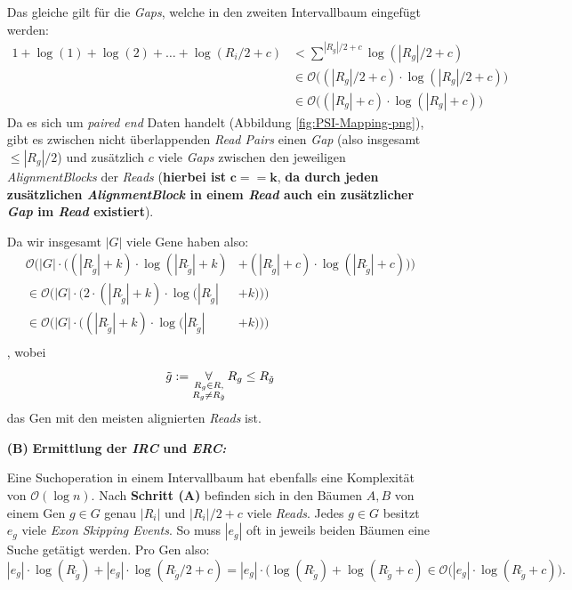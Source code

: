 \documentclass[12pt]{article}
\begin{document}
\begin{itemize}
        Das gleiche gilt für die \textit{Gaps}, welche in den zweiten Intervallbaum eingefügt werden:
        \begin{align*}
        1  + \log(1) + \log(2) + \dots + \log(R_{i}/2 + c) &< \sum^{|R_{g}|/2 + c} \log (|R_{g}|/2 + c) \\
                                                           &\in \mathcal{O}\Big((|R_{g}|/2 +c) \cdot \log(|R_{g}|/2 + c)\Big) \\
                                                           &\in \mathcal{O}\Big((|R_{g}| + c) \cdot \log(|R_{g}| + c)\Big)
        \end{align*}
        Da es sich um \textit{paired end} Daten handelt (Abbildung \ref{fig:PSI-Mapping-png}), gibt es zwischen nicht überlappenden \textit{Read Pairs} einen \textit{Gap}
        (also insgesamt $\le |R_{g}|/2$) und zusätzlich $c$ viele \textit{Gaps} zwischen den jeweiligen
        \textit{AlignmentBlocks} der \textit{Reads} (\textbf{hierbei ist} $\mathbf{c == k}$, \textbf{da durch jeden zusätzlichen \textit{AlignmentBlock} 
        in einem \textit{Read} auch ein zusätzlicher \textit{Gap} im \textit{Read} existiert}).

        Da wir insgesamt $|G|$ viele Gene haben also:
        \begin{align*}
            \mathcal{O}\Bigg(|G| \cdot \Big((|R_{\tilde g}| + k) \cdot \log(|R_{\tilde g}| + k) &+ (|R_{\tilde g}|+c) \cdot \log(|R_{\tilde g}| + c)\Big)\Bigg)\\
            \in \mathcal{O}\Bigg(|G| \cdot \Big(2 \cdot (|R_{\tilde g}| + k) \cdot \log(|R_{\tilde g}| &+ k)\Big)\Bigg)\\
            \in \mathcal{O}\Bigg(|G| \cdot \Big((|R_{\tilde g}| + k) \cdot \log(|R_{\tilde g}| &+ k)\Big)\Bigg)\\
        \end{align*}
        , wobei 
        \[
            \tilde g := \operatornamewithlimits\forall_{\substack{R_{g} \in R,\\R_{g} \not =  R_{\tilde g}}} R_{g} \le R_{\tilde g}
        \]
        das Gen mit den meisten alignierten \textit{Reads} ist.

    \item[\textbf{(B)}] \textbf{Ermittlung der \textit{IRC} und \textit{ERC:}}

        Eine Suchoperation in einem Intervallbaum hat ebenfalls eine Komplexität von $\mathcal{O}(\log n)$.
        Nach \textbf{Schritt (A)} befinden sich in den Bäumen $A,B$ von einem Gen $g \in G$ genau $|R_{i}|$
        und $|R_{i}|/2 + c$ viele \textit{Reads}.
        Jedes $g \in G$ besitzt $e_{g}$ viele \textit{Exon Skipping Events}. So muss 
        $|e_{g}|$ oft in jeweils beiden Bäumen eine Suche getätigt werden.
        Pro Gen also:
        \[
            |e_{g}| \cdot \log(R_{\tilde g}) + |e_{g}| \cdot \log(R_{\tilde g}/2 + c) = |e_{g}| \cdot  (\log(R_{\tilde g}) + \log(R_{\tilde g} + c) \in \mathcal{O}\Big(|e_{g}| \cdot \log(R_{\tilde g} + c)\Big)
        .\]
\end{itemize}
\end{document}
